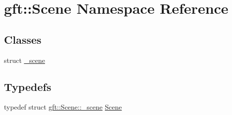 \hypertarget{namespacegft_1_1Scene}{\section{gft\-:\-:Scene Namespace Reference}
\label{namespacegft_1_1Scene}
}
\subsection*{Classes}
\begin{DoxyCompactItemize}
\item 
struct \hyperlink{structgft_1_1Scene_1_1__scene}{\-\_\-scene}
\end{DoxyCompactItemize}
\subsection*{Typedefs}
\begin{DoxyCompactItemize}
\item 
typedef struct \hyperlink{structgft_1_1Scene_1_1__scene}{gft\-::\-Scene\-::\-\_\-scene} \hyperlink{namespacegft_1_1Scene_a9c4af0354661c7f13881605f34dd4f52}{Scene}
\end{DoxyCompactItemize}

